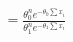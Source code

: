 \documentclass[preview]{standalone}
\begin{document}
\begin{align*}
= \frac{\theta_0^n e^{-\theta_0 \sum x_i}}{\theta_1^n e^{-\theta_1 \sum x_i}}
\end{align*}
\end{document}
